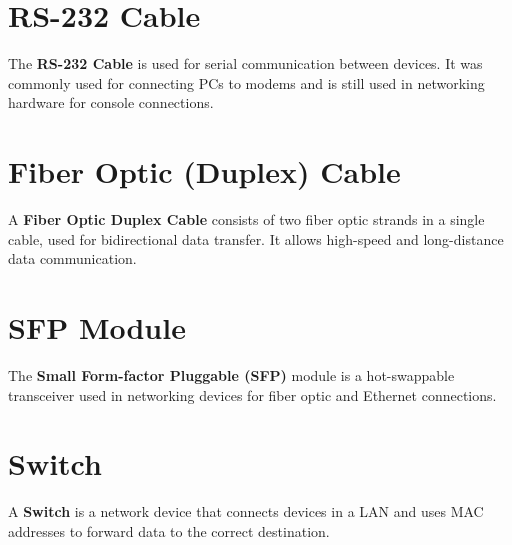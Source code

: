 \documentclass[12pt]{article}
\begin{document}
\begin{center}
\end{center}

\section{RS-232 Cable}
The \textbf{RS-232 Cable} is used for serial communication between devices. It was commonly used for connecting PCs to modems and is still used in networking hardware for console connections.

\begin{center}
\end{center}

\section{Fiber Optic (Duplex) Cable}
A \textbf{Fiber Optic Duplex Cable} consists of two fiber optic strands in a single cable, used for bidirectional data transfer. It allows high-speed and long-distance data communication.

\begin{center}
\end{center}

\section{SFP Module}
The \textbf{Small Form-factor Pluggable (SFP)} module is a hot-swappable transceiver used in networking devices for fiber optic and Ethernet connections.

\begin{center}
\end{center}

\section{Switch}
A \textbf{Switch} is a network device that connects devices in a LAN and uses MAC addresses to forward data to the correct destination.
\end{document}
